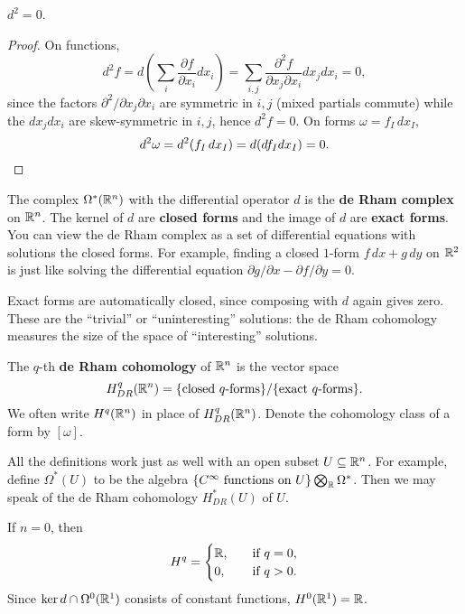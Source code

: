 \begin{prop}
    $d^2=0$.
\end{prop}
\begin{proof}
    On functions, \[
        d^2f=d\left( \sum _i \frac{\partial f}{\partial x_i }dx_i  \right) =\sum _{i,j}\frac{\partial ^2f}{\partial x_j \partial x_i }dx_j dx_i =0,
    \] since the factors $\partial ^2 /\partial x_j  \partial x_i $ are symmetric in $i,j$ (mixed partials commute) while the $dx_j dx_i $ are skew-symmetric in $i,j$, hence $d^2f=0$. On forms $\omega=f_I\,dx_I$, \[
    d^2\omega =d^2(f_I\,dx_I)=d(df_Idx_I)=0.\qedhere
    \] 
\end{proof}
The complex $\Omega^*(\mathbb{R}^n )$ with the differential operator $d$ is the \textbf{de Rham complex} on $\mathbb{R}^n $. The kernel of $d$ are \textbf{closed forms} and the image of $d$ are \textbf{exact forms}. You can view the de Rham complex as a set of differential equations with solutions the closed forms. For example, finding a closed $1$-form $f\, dx+g\,dy$ on $\mathbb{R}^2$ is just like solving the differential equation $\partial g/\partial x-\partial f /\partial y=0$.

Exact forms are automatically closed, since composing with $d$ again gives zero. These are the ``trivial'' or ``uninteresting'' solutions: the de Rham cohomology measures the size of the space of ``interesting'' solutions.

\begin{definition}[]
    The $q$-th \textbf{de Rham cohomology} of $\mathbb{R}^n $ is the vector space \[
        H_{DR}^q (\R^n )= \{\text{closed} \ q\text{-forms}\} / \{\text{exact} \ q\text{-forms}  \} .
    \] We often write $H^q(\mathbb{R}^n )$ in place of $H_{DR}^q(\mathbb{R}^n )$. Denote the cohomology class of a form by $[\omega]$.
\end{definition}
All the definitions work just as well with an open subset $U\subseteq \mathbb{R}^n $. For example, define $\Omega^*(U)$ to be the algebra $\{C^{\infty} \ \text{functions on} \ U\} \bigotimes _{\R}\Omega^*$. Then we may speak of the de Rham cohomology $H_{DR}^*(U)$ of $U$.
\begin{example}
    If $n=0$, then \[
        H^q=
    \begin{cases}
        \mathbb{R},\quad &\text{if} \ q=0,\\
        0,& \text{if} \ q>0.
    \end{cases}
\] Since $\ker d \cap \Omega^0(\mathbb{R}^1)$ consists of constant functions, $H^0(\mathbb{R}^1)=\mathbb{R}$. 
\end{example}
